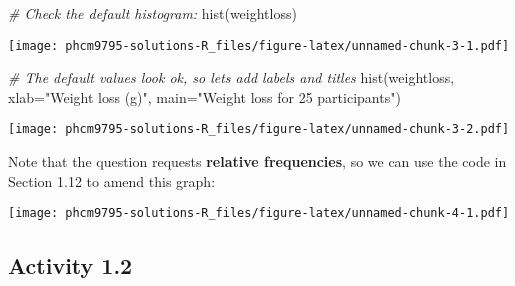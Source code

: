 \documentclass[
]{memoir}
\newenvironment{Shaded}{\begin{snugshade}}{\end{snugshade}}
\newcommand{\AttributeTok}[1]{\textcolor[rgb]{0.77,0.63,0.00}{#1}}
\newcommand{\CommentTok}[1]{\textcolor[rgb]{0.56,0.35,0.01}{\textit{#1}}}
\newcommand{\ConstantTok}[1]{\textcolor[rgb]{0.00,0.00,0.00}{#1}}
\newcommand{\DecValTok}[1]{\textcolor[rgb]{0.00,0.00,0.81}{#1}}
\newcommand{\FunctionTok}[1]{\textcolor[rgb]{0.00,0.00,0.00}{#1}}
\newcommand{\NormalTok}[1]{#1}
\newcommand{\OtherTok}[1]{\textcolor[rgb]{0.56,0.35,0.01}{#1}}
\newcommand{\SpecialCharTok}[1]{\textcolor[rgb]{0.00,0.00,0.00}{#1}}
\newcommand{\StringTok}[1]{\textcolor[rgb]{0.31,0.60,0.02}{#1}}
\begin{document}
\begin{Shaded}
\begin{Highlighting}[]
\CommentTok{\# Check the default histogram:}
\FunctionTok{hist}\NormalTok{(weightloss)}
\end{Highlighting}
\end{Shaded}

\texttt{[image: phcm9795-solutions-R\_files/figure-latex/unnamed-chunk-3-1.pdf]}

\begin{Shaded}
\begin{Highlighting}[]
\CommentTok{\# The default values look ok, so let\textquotesingle{}s add labels and titles}
\FunctionTok{hist}\NormalTok{(weightloss, }\AttributeTok{xlab=}\StringTok{"Weight loss (g)"}\NormalTok{, }\AttributeTok{main=}\StringTok{"Weight loss for 25 participants"}\NormalTok{)}
\end{Highlighting}
\end{Shaded}

\texttt{[image: phcm9795-solutions-R\_files/figure-latex/unnamed-chunk-3-2.pdf]}

Note that the question requests \textbf{relative frequencies}, so we can use the code in Section 1.12 to amend this graph:

\begin{Shaded}
\end{Shaded}

\texttt{[image: phcm9795-solutions-R\_files/figure-latex/unnamed-chunk-4-1.pdf]}

\hypertarget{activity-1.2}{%
\subsection*{Activity 1.2}\label{activity-1.2}}
\end{document}
